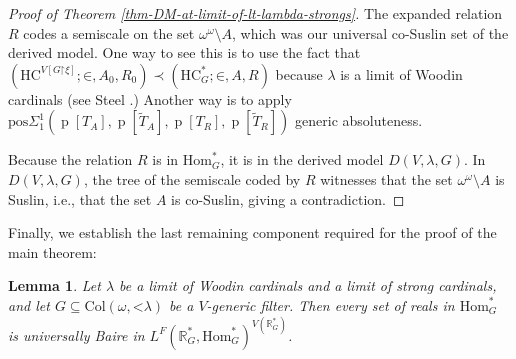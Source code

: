 \documentclass[fleqn, 11pt]{amsart}
\theoremstyle{plain}
\newtheorem{lem}[thm]{Lemma} \newtheorem*{lem*}{Lemma}
\theoremstyle{definition}
\theoremstyle{remark}
\newcommand{\Hom}{\mathrm{Hom}}
\newcommand{\uB}{\mathrm{uB}}
\newcommand{\HC}{\mathrm{HC}}
\newcommand{\posSigmaoneone}{\mathrm{pos}\Sigma^1_1}
\newcommand{\Col}{\mathrm{Col}}
\newcommand{\restrict}{\mathord{\restriction}}
\DeclareMathOperator{\p}{p}
\begin{document}
\begin{proof}[Proof of Theorem \ref{thm-DM-at-limit-of-lt-lambda-strongs}]
 
The expanded relation $R$ codes a semiscale on the set $\omega^\omega \setminus A$, which was our universal co-Suslin set of the derived model.
One way to see this is to use the fact that $(\HC^{V[G \restrict \xi]}; \mathord{\in}, A_0,R_0) \prec (\HC^*_G; \mathord{\in}, A, R)$ because $\lambda$ is a limit of Woodin cardinals
 (see Steel \cite[Lemma 7.3]{SteDMT}.)
 Another way 
 is to apply $\posSigmaoneone(\p[T_A],\p[\tilde{T}_A],\p[T_R],\p[\tilde{T}_R])$ generic absoluteness.  
  
 Because the relation $R$ is in $\Hom^*_G$, it is in the derived model $D(V,\lambda,G)$.
 In $D(V,\lambda,G)$, the tree of the semiscale coded by $R$ witnesses that the set $\omega^\omega \setminus A$ is Suslin, i.e., that the set $A$ is co-Suslin, giving a contradiction.
\end{proof}












Finally, we establish the last remaining component required for the proof of the main theorem:

\begin{lem}\label{lem-absorption-of-uB}
Let $\lambda$ be a limit of Woodin cardinals and a limit of strong cardinals, and  let $G \subseteq \Col(\omega,\mathord{<}\lambda)$ be a $V$-generic filter.
Then every set of reals in $\Hom^*_G$ is universally Baire in $L^F(\mathbb{R}^*_G, \Hom^*_G)^{V(\mathbb{R}^*_G)}$.
\end{lem}
\end{document}
